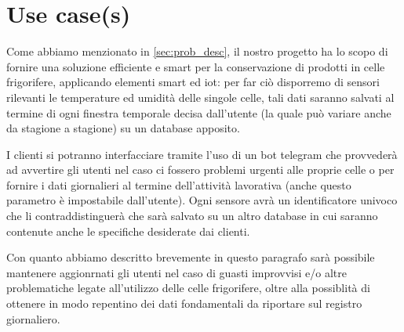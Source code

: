 \section{Use case(s)}
Come abbiamo menzionato in \ref{sec:prob_desc}, il nostro progetto ha lo scopo di fornire una soluzione efficiente e smart per la conservazione di prodotti in celle frigorifere, applicando elementi smart ed iot: per far ciò disporremo di sensori rilevanti le temperature ed umidità delle singole celle, tali dati saranno salvati al termine di ogni finestra temporale decisa dall'utente (la quale può variare anche da stagione a stagione) su un database apposito.
\vspace{3mm}

I clienti si potranno interfacciare tramite l'uso di un bot telegram che provvederà ad avvertire gli utenti nel caso ci fossero problemi urgenti alle proprie celle o per fornire i dati giornalieri al termine dell'attività lavorativa (anche questo parametro è impostabile dall'utente). Ogni sensore avrà un identificatore univoco che li contraddistinguerà che sarà salvato su un altro database in cui saranno contenute anche le specifiche desiderate dai clienti.
\vspace{3mm}

Con quanto abbiamo descritto brevemente in questo paragrafo sarà possibile mantenere aggionrnati gli utenti nel caso di guasti improvvisi e/o altre problematiche legate all'utilizzo delle celle frigorifere, oltre alla possiblità di ottenere in modo repentino dei dati fondamentali da riportare sul registro giornaliero.


